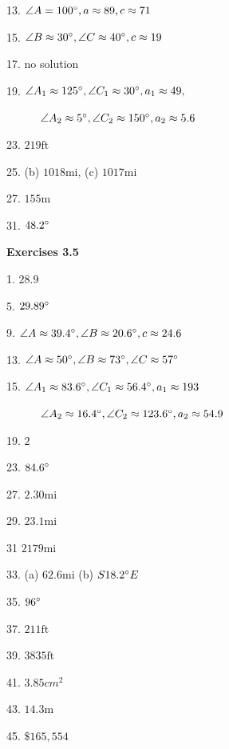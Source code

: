 13. $\angle A =100 \mbox{{\ensuremath{{}^\circ}}} ,a \approx 89 ,c \approx 71$ 

15. $\angle B \approx 30 \mbox{{\ensuremath{{}^\circ}}} ,\angle C \approx 40 \mbox{{\ensuremath{{}^\circ}}} ,c \approx 19$ 

17. no solution 

19. $\angle A_{1} \approx 125 \mbox{{\ensuremath{{}^\circ}}} ,\angle C_{1} \approx 30 \mbox{{\ensuremath{{}^\circ}}} ,a_{1} \approx 49\text{,}$ 

\ \ \ \ \ \ $\angle A_{2} \approx 5 \mbox{{\ensuremath{{}^\circ}}} ,\angle C_{2} \approx 150 \mbox{{\ensuremath{{}^\circ}}} ,a_{2} \approx 5.6$ 

23. $219 \mbox{ft}$ 

25. (b) $1018 \mbox{mi}\text{,}$ (c) $1017 \mbox{mi}$ 

27. $155 \mbox{m}$ 

31. $48.2 \mbox{{\ensuremath{{}^\circ}}}$ 

\textbf{Exercises 3.5} 

1. $28.9$ 

5. $29.89 \mbox{{\ensuremath{{}^\circ}}}$ 

9. $\angle A \approx 39.4 \mbox{{\ensuremath{{}^\circ}}} ,\angle B \approx 20.6 \mbox{{\ensuremath{{}^\circ}}} ,c \approx 24.6$ 

13. $\angle A \approx 50 \mbox{{\ensuremath{{}^\circ}}} ,\angle B \approx 73 \mbox{{\ensuremath{{}^\circ}}} ,\angle C \approx 57 \mbox{{\ensuremath{{}^\circ}}}$ 

15. $\angle A_{1} \approx 83.6 \mbox{{\ensuremath{{}^\circ}}} ,\angle C_{1} \approx 56.4 \mbox{{\ensuremath{{}^\circ}}} ,a_{1} \approx 193$ 

\ \ \ \ \ \ $\angle A_{2} \approx 16.4 \mbox{{\ensuremath{{}^\circ}}} ,\angle C_{2} \approx 123.6 \mbox{{\ensuremath{{}^\circ}}} ,a_{2} \approx 54.9$ 

19. $2$ 

23. $84.6 \mbox{{\ensuremath{{}^\circ}}}$ 

27. $2.30 \mbox{mi}$ 

29. $23.1 \mbox{mi}$ 

31 $2179 \mbox{mi}$ 

33. (a) $62.6 \mbox{mi}$ (b) $S 18.2 \mbox{{\ensuremath{{}^\circ}}} E$ 

35. $96 \mbox{{\ensuremath{{}^\circ}}}$ 

37. $211 \mbox{ft}$ 

39. $3835 \mbox{ft}$ 

41. $3.85 cm^{2}$ 

43. $14.3 \mbox{m}$ 

45. $ \$165,554$ 
